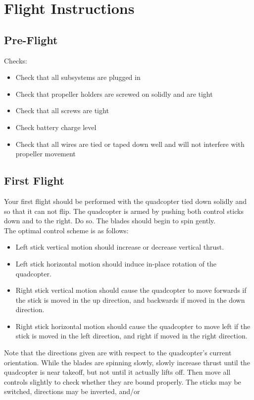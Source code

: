 \section{Flight Instructions}
\subsection{Pre-Flight}
Checks:
\begin{itemize}
\item Check that all subsystems are plugged in
\item Check that propeller holders are screwed on solidly and are tight
\item Check that all screws are tight
\item Check battery charge level
\item Check that all wires are tied or taped down well and will not interfere with propeller movement
\end{itemize}
\subsection{First Flight}
Your first flight should be performed with the quadcopter tied down solidly and so that it can not flip. The quadcopter is armed by pushing both control sticks down and to the right. Do so. The blades should begin to spin gently.\\
\indent The optimal control scheme is as follows:
\begin{itemize}
\item Left stick vertical motion should increase or decrease vertical thrust.
\item Left stick horizontal motion should induce in-place rotation of the quadcopter.
\item Right stick vertical motion should cause the quadcopter to move forwards if the stick is moved in the up direction, and backwards if moved in the down direction.
\item Right stick horizontal motion should cause the quadcopter to move left if the stick is moved in the left direction, and right if moved in the right direction.
\end{itemize}
Note that the directions given are with respect to the quadcopter's current orientation.
\indent While the blades are spinning slowly, slowly increase thrust until the quadcopter is near takeoff, but not until it actually lifts off. Then move all controls slightly to check whether they are bound properly. The sticks may be switched, directions may be inverted, and/or 

